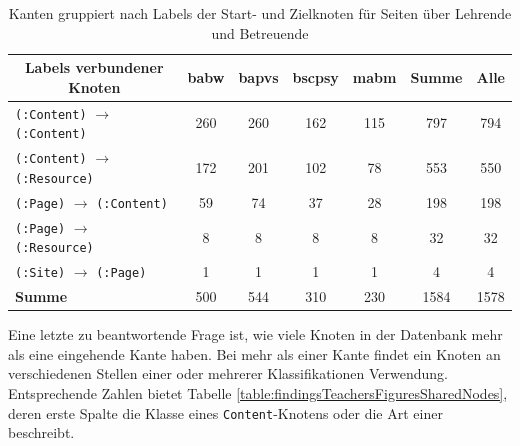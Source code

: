     \begin{table}[htb]
        \centering
        \begin{tabular}{|l|c|c|c|c|c|c|}
            \hline
            \multicolumn{1}{|c|}{\textbf{Labels verbundener Knoten}} & \textbf{\gls{babw}} & \textbf{\gls{bapvs}} & \textbf{\gls{bscpsy}} & \textbf{\gls{mabm}} & \textbf{Summe} & \textbf{Alle} \\ \hline
            \texttt{(:Content)} $\rightarrow$ \texttt{(:Content)}                           & 260           & 260            & 162             & 115           & 797            & 794           \\ \hline
            \texttt{(:Content)} $\rightarrow$ \texttt{(:Resource)}                         & 172           & 201            & 102             & 78            & 553            & 550           \\ \hline
            \texttt{(:Page)} $\rightarrow$ \texttt{(:Content)}                              & 59            & 74             & 37              & 28            & 198            & 198           \\ \hline
            \texttt{(:Page)} $\rightarrow$ \texttt{(:Resource)}                             & 8             & 8              & 8               & 8             & 32             & 32            \\ \hline
            \texttt{(:Site)} $\rightarrow$ \texttt{(:Page)}                                 & 1             & 1              & 1               & 1             & 4              & 4             \\ \hline
            \hline
            \textbf{Summe}                                          & 500           & 544            & 310             & 230           & 1584           & 1578          \\ \hline
        \end{tabular}
        \caption{Kanten gruppiert nach Labels der Start- und Zielknoten für Seiten über Lehrende und Betreuende}
        \label{table:findingsTeachersFiguresEdgesByStartEndNodeLabel}
    \end{table}

    Eine letzte zu beantwortende Frage ist,
    wie viele Knoten in der Datenbank mehr als eine eingehende Kante haben.
    Bei mehr als einer Kante findet ein Knoten an verschiedenen Stellen 
    einer oder mehrerer Klassifikationen Verwendung.
    Entsprechende Zahlen bietet Tabelle \ref{table:findingsTeachersFiguresSharedNodes},
    deren erste Spalte die Klasse eines \texttt{Content}-Knotens oder
    die Art einer {\resource} beschreibt.

